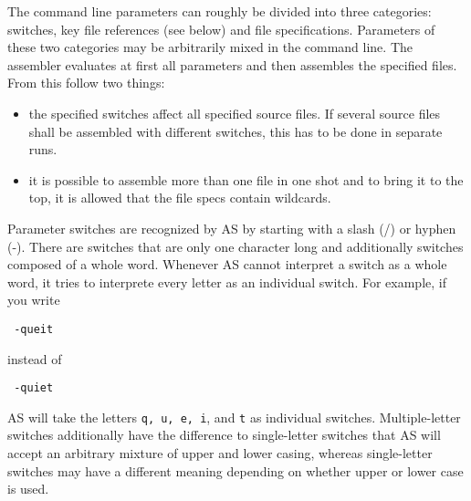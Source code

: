 \documentclass[12pt,twoside]{report}
\newcommand{\tty}[1]{{\tt #1}}
\newcommand{\asname}{{AS}}
\begin{document}
The command line parameters can roughly be divided into three categories:
switches, key file references (see below) and file specifications.
Parameters of these two categories may be arbitrarily mixed in the command
line.  The assembler evaluates at first all parameters and then assembles
the specified files.  From this follow two things:
\begin{itemize}
\item{the specified switches affect all specified source files. If
      several source files shall be assembled with different switches,
      this has to be done in separate runs.}
\item{it is possible to assemble more than one file in one shot and to
      bring it to the top, it is allowed that the file specs contain
      wildcards.}
\end{itemize}
Parameter switches are recognized by \asname{} by starting with
a slash (/) or hyphen (-).  There are switches that are only one
character long and additionally switches composed of a whole word.
Whenever \asname{} cannot interpret a switch as a whole word, it tries to
interprete every letter as an individual switch.  For example, if you
write
\begin{verbatim}
 -queit
\end{verbatim}
instead of
\begin{verbatim}
 -quiet
\end{verbatim}
\asname{} will take the letters \tty{q, u, e, i}, and \tty{t} as individual
switches.  Multiple-letter switches additionally have the difference to
single-letter switches that \asname{} will accept an arbitrary mixture of upper
and lower casing, whereas single-letter switches may have a different
meaning depending on whether upper or lower case is used.
\end{document}
